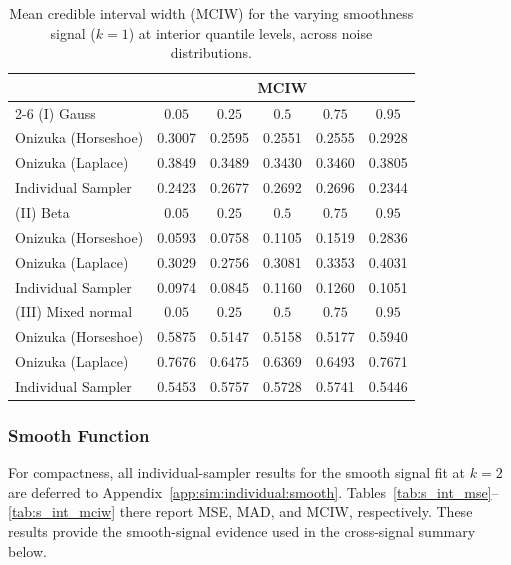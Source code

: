 \begin{table}[htbp]
\centering
\caption{Mean credible interval width (MCIW) for the varying smoothness signal ($k=1$) at interior quantile levels, across noise distributions.}
\label{tab:vs_int_mciw}
\begin{tabular}{lccccc}
\toprule
& \multicolumn{5}{c}{MCIW} \\
\cmidrule(lr){2-6}
(I) Gauss & $0.05$ & $0.25$ & $0.5$ & $0.75$ & $0.95$ \\
\midrule
Onizuka (Horseshoe) & 0.3007 & 0.2595 & 0.2551 & 0.2555 & 0.2928 \\
Onizuka (Laplace)   & 0.3849 & 0.3489 & 0.3430 & 0.3460 & 0.3805 \\
Individual Sampler  & 0.2423 & 0.2677 & 0.2692 & 0.2696 & 0.2344 \\
\midrule
(II) Beta & $0.05$ & $0.25$ & $0.5$ & $0.75$ & $0.95$ \\
\midrule
Onizuka (Horseshoe) & 0.0593 & 0.0758 & 0.1105 & 0.1519 & 0.2836 \\
Onizuka (Laplace)   & 0.3029 & 0.2756 & 0.3081 & 0.3353 & 0.4031 \\
Individual Sampler  & 0.0974 & 0.0845 & 0.1160 & 0.1260 & 0.1051 \\
\midrule
(III) Mixed normal & $0.05$ & $0.25$ & $0.5$ & $0.75$ & $0.95$ \\
\midrule
Onizuka (Horseshoe) & 0.5875 & 0.5147 & 0.5158 & 0.5177 & 0.5940 \\
Onizuka (Laplace)   & 0.7676 & 0.6475 & 0.6369 & 0.6493 & 0.7671 \\
Individual Sampler  & 0.5453 & 0.5757 & 0.5728 & 0.5741 & 0.5446 \\
\bottomrule
\end{tabular}
\end{table}

\subsubsection{Smooth Function}
\label{sec:sim:ind:smooth}

For compactness, all individual-sampler results for the smooth signal fit at $k=2$ are deferred to Appendix~\ref{app:sim:individual:smooth}. Tables~\ref{tab:s_int_mse}--\ref{tab:s_int_mciw} there report MSE, MAD, and MCIW, respectively. These results provide the smooth-signal evidence used in the cross-signal summary below.

